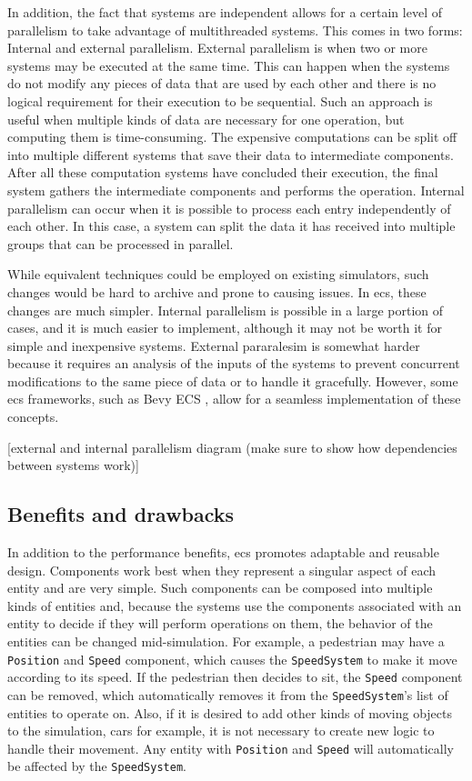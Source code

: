\documentclass[twoside, 11pt]{article}
\begin{document}
In addition, the fact that systems are independent allows for a certain level of parallelism to take advantage of multithreaded systems. This comes in two forms: Internal and external parallelism. External parallelism is when two or more systems may be executed at the same time. This can happen when the systems do not modify any pieces of data that are used by each other and there is no logical requirement for their execution to be sequential. Such an approach is useful when multiple kinds of data are necessary for one operation, but computing them is time-consuming. The expensive computations can be split off into multiple different systems that save their data to intermediate components. After all these computation systems have concluded their execution, the final system gathers the intermediate components and performs the operation. Internal parallelism can occur when it is possible to process each entry independently of each other. In this case, a system can split the data it has received into multiple groups that can be processed in parallel.

While equivalent techniques could be employed on existing simulators, such changes would be hard to archive and prone to causing issues. In \gls{ecs}, these changes are much simpler. Internal parallelism is possible in a large portion of cases, and it is much easier to implement, although it may not be worth it for simple and inexpensive systems. External pararalesim is somewhat harder because it requires an analysis of the inputs of the systems to prevent concurrent modifications to the same piece of data or to handle it gracefully. However, some \gls{ecs} frameworks, such as Bevy ECS \cite{bevy}, allow for a seamless implementation of these concepts.

[external and internal parallelism diagram (make sure to show how dependencies between systems work)]

\subsection{Benefits and drawbacks}

In addition to the performance benefits, \gls{ecs} promotes adaptable and reusable design. Components work best when they represent a singular aspect of each entity and are very simple. Such components can be composed into multiple kinds of entities and, because the systems use the components associated with an entity to decide if they will perform operations on them, the behavior of the entities can be changed mid-simulation. For example, a pedestrian may have a \verb|Position| and \verb|Speed| component, which causes the \verb|SpeedSystem| to make it move according to its speed. If the pedestrian then decides to sit, the \verb|Speed| component can be removed, which automatically removes it from the \verb|SpeedSystem|'s list of entities to operate on. Also, if it is desired to add other kinds of moving objects to the simulation, cars for example, it is not necessary to create new logic to handle their movement. Any entity with \verb|Position| and \verb|Speed| will automatically be affected by the \verb|SpeedSystem|.
\end{document}
